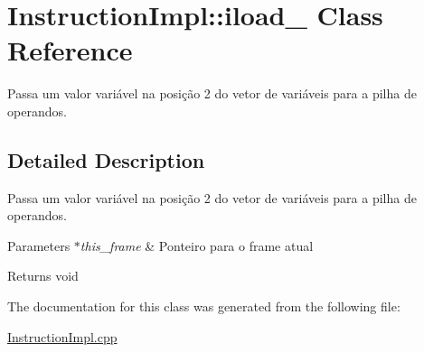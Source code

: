 \hypertarget{class_instruction_impl_1_1iload__2}{}\section{Instruction\+Impl\+:\+:iload\+\_ Class Reference}
\label{class_instruction_impl_1_1iload__2}


Passa um valor variável na posição 2 do vetor de variáveis para a pilha de operandos.  




\subsection{Detailed Description}
Passa um valor variável na posição 2 do vetor de variáveis para a pilha de operandos. 


\begin{DoxyParams}{Parameters}
{\em $\ast$this\+\_\+frame} & Ponteiro para o frame atual \\
\hline
\end{DoxyParams}
\begin{DoxyReturn}{Returns}
void 
\end{DoxyReturn}


The documentation for this class was generated from the following file\+:\begin{DoxyCompactItemize}
\item 
\hyperlink{_instruction_impl_8cpp}{Instruction\+Impl.\+cpp}\end{DoxyCompactItemize}

